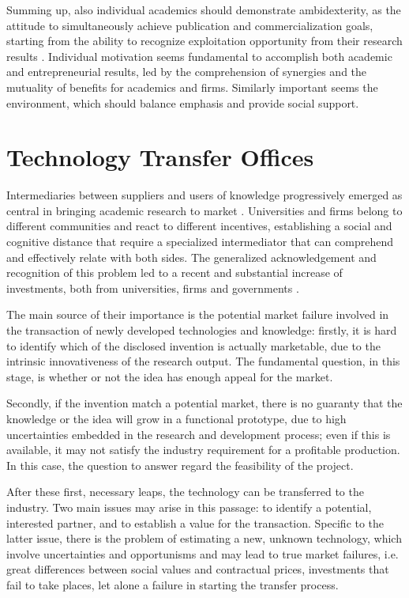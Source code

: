 Summing up, also individual academics should demonstrate ambidexterity, as the attitude to simultaneously achieve publication and commercialization goals, starting from the ability to recognize exploitation opportunity from their research results \citep{Chang2016}. Individual motivation seems fundamental to accomplish both academic and entrepreneurial results, led by the comprehension of synergies and the mutuality of benefits for academics and firms. Similarly important seems the environment, which should balance emphasis and provide social support. 

\section{Technology Transfer Offices}

Intermediaries between suppliers and users of knowledge progressively emerged as central in bringing academic research to market \citep{Landry2013}. Universities and firms belong to different communities and react to different incentives, establishing a social and cognitive distance that require a specialized intermediator that can comprehend and effectively relate with both sides. The generalized acknowledgement and recognition of this problem led to a recent and substantial increase of investments, both from universities, firms and governments \citep{Muscio2010}.

The main source of their importance is the potential market failure involved in the transaction of newly developed technologies and knowledge: firstly, it is hard to identify which of the disclosed invention is actually marketable, due to the intrinsic innovativeness of the research output. The fundamental question, in this stage, is whether or not the idea has enough appeal for the market.

Secondly, if the invention match a potential market, there is no guaranty that the knowledge or the idea will grow in a functional prototype, due to high uncertainties embedded in the research and development process; even if this is available, it may not satisfy the industry requirement for a profitable production. In this case, the question to answer regard the feasibility of the project.

After these first, necessary leaps, the technology can be transferred to the industry. Two main issues may arise in this passage: to identify a potential, interested partner, and to establish a value for the transaction. Specific to the latter issue, there is the problem of estimating a new, unknown technology, which involve uncertainties and opportunisms and may lead to true market failures, i.e. great differences between social values and contractual prices, investments that fail to take places, let alone a failure in starting the transfer process.

